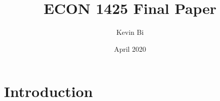 \documentclass{article}
\title{ECON 1425 Final Paper}
\author{Kevin Bi}
\date{April 2020}
\begin{document}
\maketitle

\section{Introduction}
\end{document}
